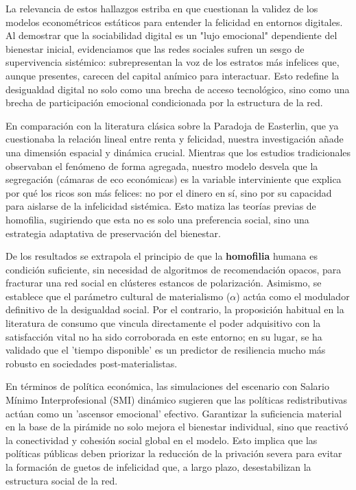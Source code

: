 \documentclass[a4paper,12pt]{article}
\begin{document}
La relevancia de estos hallazgos estriba en que cuestionan la validez de los modelos econométricos estáticos para entender la felicidad en entornos digitales. Al demostrar que la sociabilidad digital es un "lujo emocional" dependiente del bienestar inicial, evidenciamos que las redes sociales sufren un sesgo de supervivencia sistémico: subrepresentan la voz de los estratos más infelices que, aunque presentes, carecen del capital anímico para interactuar. Esto redefine la desigualdad digital no solo como una brecha de acceso tecnológico, sino como una brecha de participación emocional condicionada por la estructura de la red.

En comparación con la literatura clásica sobre la Paradoja de Easterlin, que ya cuestionaba la relación lineal entre renta y felicidad, nuestra investigación añade una dimensión espacial y dinámica crucial. Mientras que los estudios tradicionales observaban el fenómeno de forma agregada, nuestro modelo desvela que la segregación (cámaras de eco económicas) es la variable interviniente que explica por qué los ricos son más felices: no por el dinero en sí, sino por su capacidad para aislarse de la infelicidad sistémica. Esto matiza las teorías previas de homofilia, sugiriendo que esta no es solo una preferencia social, sino una estrategia adaptativa de preservación del bienestar.

De los resultados se extrapola el principio de que la \textbf{homofilia} humana es condición suficiente, sin necesidad de algoritmos de recomendación opacos, para fracturar una red social en clústeres estancos de polarización. Asimismo, se establece que el parámetro cultural de materialismo ($\alpha$) actúa como el modulador definitivo de la desigualdad social. Por el contrario, la proposición habitual en la literatura de consumo que vincula directamente el poder adquisitivo con la satisfacción vital no ha sido corroborada en este entorno; en su lugar, se ha validado que el 'tiempo disponible' es un predictor de resiliencia mucho más robusto en sociedades post-materialistas.

En términos de política económica, las simulaciones del escenario con Salario Mínimo Interprofesional (SMI) dinámico sugieren que las políticas redistributivas actúan como un 'ascensor emocional' efectivo. Garantizar la suficiencia material en la base de la pirámide no solo mejora el bienestar individual, sino que reactivó la conectividad y cohesión social global en el modelo. Esto implica que las políticas públicas deben priorizar la reducción de la privación severa para evitar la formación de guetos de infelicidad que, a largo plazo, desestabilizan la estructura social de la red.
\end{document}
